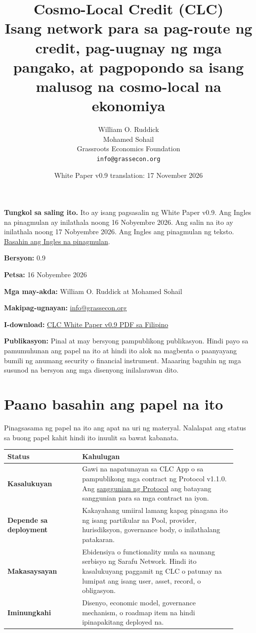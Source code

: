 \documentclass[11pt]{article}
\title{Cosmo-Local Credit (CLC)\\Isang network para sa pag-route ng credit, pag-uugnay ng mga pangako, at pagpopondo sa isang malusog na cosmo-local na ekonomiya}
\author{William O. Ruddick \\ Mohamed Sohail \\ Grassroots Economics Foundation \\ \texttt{info@grassecon.org}}
\date{White Paper v0.9 translation: 17 November 2026}
\begin{document}
\maketitle
\tableofcontents
\newpage
\sloppy
\RaggedRight

\textbf{Tungkol sa saling ito.} Ito ay isang pagsasalin ng White Paper v0.9. Ang Ingles na pinagmulan ay inilathala noong 16 Nobyembre 2026. Ang salin na ito ay inilathala noong 17 Nobyembre 2026. Ang Ingles ang pinagmulan ng teksto. \href{https://docs.cosmolocal.credit/white-paper}{Basahin ang Ingles na pinagmulan}.

\textbf{Bersyon:} 0.9

\textbf{Petsa:} 16 Nobyembre 2026

\textbf{Mga may-akda:} William O. Ruddick at Mohamed Sohail

\textbf{Makipag-ugnayan:} \href{mailto:info@grassecon.org}{info@grassecon.org}

\textbf{I-download:} \href{https://docs.cosmolocal.credit/white-paper/Cosmo-Local-Credit-CLC-White-Paper-v9-fil.pdf}{CLC White Paper v0.9 PDF sa Filipino}

\textbf{Publikasyon:} Pinal at may bersyong pampublikong publikasyon. Hindi payo sa pamumuhunan ang papel na ito at hindi ito alok na magbenta o paanyayang bumili ng anumang security o financial instrument. Maaaring baguhin ng mga susunod na bersyon ang mga disenyong inilalarawan dito.

\section*{Paano basahin ang papel na ito}

Pinagsasama ng papel na ito ang apat na uri ng materyal. Nalalapat ang status sa buong papel kahit hindi ito inuulit sa bawat kabanata.

\begin{longtable}{P{0.30\linewidth} P{0.62\linewidth}}
\toprule
Status & Kahulugan \\
\midrule
\endhead
\textbf{Kasalukuyan} & Gawi na napatunayan sa CLC App o sa pampublikong mga contract ng Protocol v1.1.0. Ang \href{https://docs.cosmolocal.credit/fil/protocol/overview}{sanggunian ng Protocol} ang batayang sanggunian para sa mga contract na iyon. \\
\textbf{Depende sa deployment} & Kakayahang umiiral lamang kapag pinagana ito ng isang partikular na Pool, provider, hurisdiksyon, governance body, o inilathalang patakaran. \\
\textbf{Makasaysayan} & Ebidensiya o functionality mula sa naunang serbisyo ng Sarafu Network. Hindi ito kasalukuyang paggamit ng CLC o patunay na lumipat ang isang user, asset, record, o obligasyon. \\
\textbf{Iminungkahi} & Disenyo, economic model, governance mechanism, o roadmap item na hindi ipinapakitang deployed na. \\
\bottomrule
\end{longtable}
\end{document}
